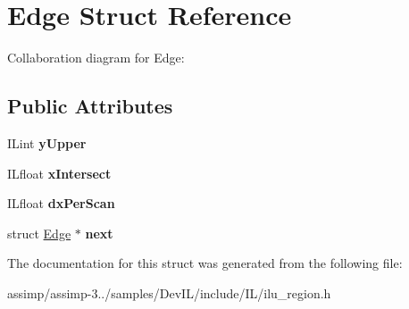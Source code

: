 \hypertarget{struct_edge}{\section{Edge Struct Reference}
\label{struct_edge}
}


Collaboration diagram for Edge\+:
\subsection*{Public Attributes}
\begin{DoxyCompactItemize}
\item 
\hypertarget{struct_edge_a1a16dc4d2ff0f05a9e6eabc7312be54b}{I\+Lint {\bfseries y\+Upper}}\label{struct_edge_a1a16dc4d2ff0f05a9e6eabc7312be54b}

\item 
\hypertarget{struct_edge_a582f1338a0dceb913bdafa9be91da96f}{I\+Lfloat {\bfseries x\+Intersect}}\label{struct_edge_a582f1338a0dceb913bdafa9be91da96f}

\item 
\hypertarget{struct_edge_ac68297f57351e80c50311788dfc7ebb7}{I\+Lfloat {\bfseries dx\+Per\+Scan}}\label{struct_edge_ac68297f57351e80c50311788dfc7ebb7}

\item 
\hypertarget{struct_edge_a6364279547b42e7fa3e418f44ec29f18}{struct \hyperlink{struct_edge}{Edge} $\ast$ {\bfseries next}}\label{struct_edge_a6364279547b42e7fa3e418f44ec29f18}

\end{DoxyCompactItemize}


The documentation for this struct was generated from the following file\+:\begin{DoxyCompactItemize}
\item 
assimp/assimp-\/3../samples/\+Dev\+I\+L/include/\+I\+L/ilu\+\_\+region.\+h\end{DoxyCompactItemize}

